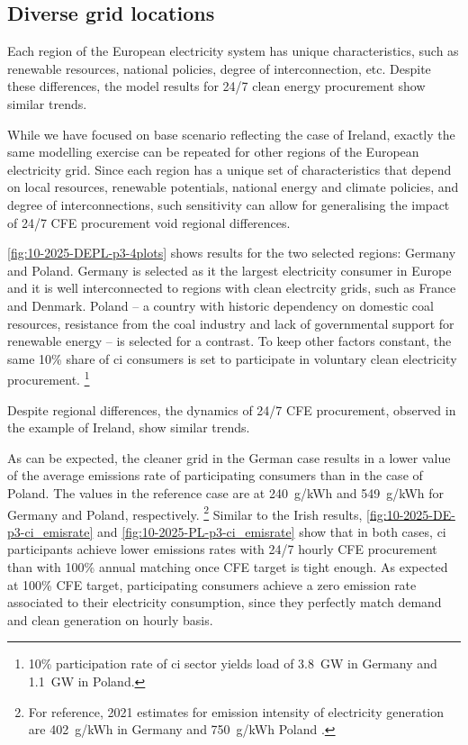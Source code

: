 \subsection{Diverse grid locations}
\label{subsec:location}

\vspace{10pt}
\begin{res}
    Each region of the European electricity system has unique characteristics, such as renewable resources, national policies, degree of interconnection, etc.
    Despite these differences, the model results for 24/7 clean energy procurement show similar trends. 
\end{res}

While we have focused on base scenario reflecting the case of Ireland, exactly the same modelling exercise can be repeated for other regions of the European electricity grid.
Since each region has a unique set of characteristics that depend on local resources, renewable potentials, national energy and climate policies, and degree of interconnections, such sensitivity can allow for generalising the impact of 24/7 CFE procurement void regional differences.

\cref{fig:10-2025-DEPL-p3-4plots} shows results for the two selected regions: Germany and Poland. Germany is selected as it the largest electricity consumer in Europe and it is well interconnected to regions with clean electrcity grids, such as France and Denmark. 
Poland -- a country with  historic dependency on domestic coal resources, resistance from the coal industry and lack of governmental support for renewable energy -- is selected for a contrast. To keep other factors constant, the same 10\% share of \gls{ci} consumers is set to participate in voluntary clean electricity procurement.%
\footnote{10\% participation rate of \gls{ci} sector yields load of 3.8~GW in Germany and 1.1~GW in Poland.}

Despite regional differences, the dynamics of 24/7 CFE procurement, observed in the example of Ireland, show similar trends. 

As can be expected, the cleaner grid in the German case results in a lower value of the average emissions rate of participating consumers than in the case of Poland. 
The values in the reference case are at 240~g\co/kWh and 549~g\co/kWh for Germany and Poland, respectively.%
\footnote{For reference, 2021 estimates for emission intensity of electricity generation are 402~g\co/kWh in Germany and 750~g\co/kWh Poland \cite{EEA-europa-web}.}
Similar to the Irish results, \cref{fig:10-2025-DE-p3-ci_emisrate} and \cref{fig:10-2025-PL-p3-ci_emisrate} show that in both cases, \gls{ci} participants achieve lower emissions rates with 24/7 hourly CFE procurement than with 100\% annual matching once CFE target is tight enough. 
As expected at 100\% CFE target, participating consumers achieve a zero emission rate associated to their electricity consumption, since they perfectly match demand and clean generation on hourly basis.

